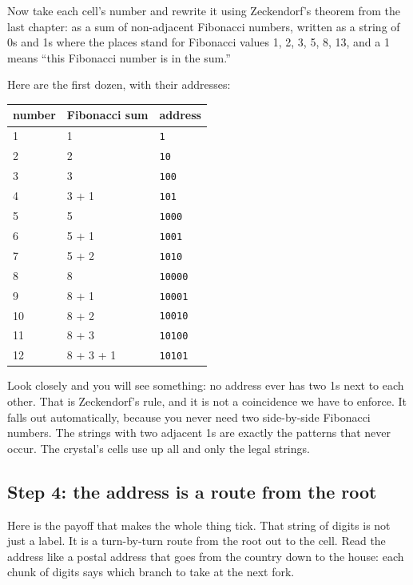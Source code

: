 Now take each cell's number and rewrite it using Zeckendorf's theorem from the last chapter: as a sum of non-adjacent Fibonacci numbers, written as a string of 0s and 1s where the places stand for Fibonacci values 1, 2, 3, 5, 8, 13, and a 1 means ``this Fibonacci number is in the sum.''

Here are the first dozen, with their addresses:

\begin{table}[h]
\centering
\small
\begin{tabular}{lll}
\toprule
\multicolumn{1}{c}{number} & \multicolumn{1}{c}{Fibonacci sum} & \multicolumn{1}{c}{address} \\
\midrule
1 & 1 & \texttt{1} \\
2 & 2 & \texttt{10} \\
3 & 3 & \texttt{100} \\
4 & 3 + 1 & \texttt{101} \\
5 & 5 & \texttt{1000} \\
6 & 5 + 1 & \texttt{1001} \\
7 & 5 + 2 & \texttt{1010} \\
8 & 8 & \texttt{10000} \\
9 & 8 + 1 & \texttt{10001} \\
10 & 8 + 2 & \texttt{10010} \\
11 & 8 + 3 & \texttt{10100} \\
12 & 8 + 3 + 1 & \texttt{10101} \\
\bottomrule
\end{tabular}
\end{table}

Look closely and you will see something: no address ever has two 1s next to each other. That is Zeckendorf's rule, and it is not a coincidence we have to enforce. It falls out automatically, because you never need two side-by-side Fibonacci numbers. The strings with two adjacent 1s are exactly the patterns that never occur. The crystal's cells use up all and only the legal strings.

\subsection{Step 4: the address is a route from the root}

Here is the payoff that makes the whole thing tick. That string of digits is not just a label. It is a turn-by-turn route from the root out to the cell. Read the address like a postal address that goes from the country down to the house: each chunk of digits says which branch to take at the next fork.

